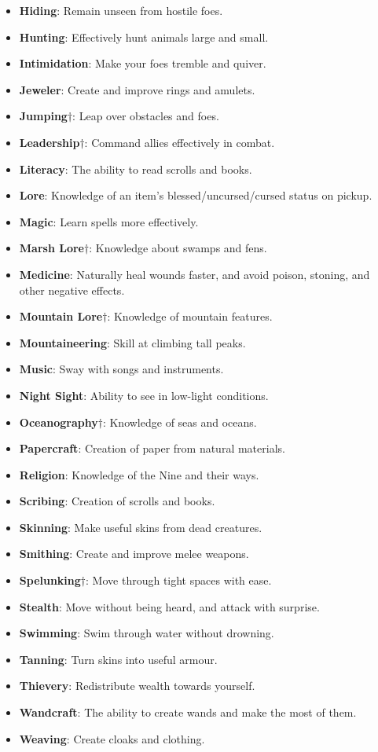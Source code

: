 \begin{itemize}
\item {\bf Hiding}: Remain unseen from hostile foes.
\item {\bf Hunting}: Effectively hunt animals large and small. 
\item {\bf Intimidation}: Make your foes tremble and quiver. 
\item {\bf Jeweler}: Create and improve rings and amulets. 
\item {\bf Jumping}$\dagger$: Leap over obstacles and foes.
\item {\bf Leadership}$\dagger$: Command allies effectively in combat. 
\item {\bf Literacy}: The ability to read scrolls and books.
\item {\bf Lore}: Knowledge of an item's blessed/uncursed/cursed status on pickup.
\item {\bf Magic}: Learn spells more effectively. 
\item {\bf Marsh Lore}$\dagger$: Knowledge about swamps and fens. 
\item {\bf Medicine}: Naturally heal wounds faster, and avoid poison, stoning, and other negative effects.
\item {\bf Mountain Lore}$\dagger$: Knowledge of mountain features. 
\item {\bf Mountaineering}: Skill at climbing tall peaks. 
\item {\bf Music}: Sway with songs and instruments. 
\item {\bf Night Sight}: Ability to see in low-light conditions. 
\item {\bf Oceanography}$\dagger$: Knowledge of seas and oceans. 
\item {\bf Papercraft}: Creation of paper from natural materials. 
\item {\bf Religion}: Knowledge of the Nine and their ways. 
\item {\bf Scribing}: Creation of scrolls and books. 
\item {\bf Skinning}: Make useful skins from dead creatures. 
\item {\bf Smithing}: Create and improve melee weapons.
\item {\bf Spelunking}$\dagger$: Move through tight spaces with ease.
\item {\bf Stealth}: Move without being heard, and attack with surprise.
\item {\bf Swimming}: Swim through water without drowning.
\item {\bf Tanning}: Turn skins into useful armour.
\item {\bf Thievery}: Redistribute wealth towards yourself.
\item {\bf Wandcraft}: The ability to create wands and make the most of them.
\item {\bf Weaving}: Create cloaks and clothing.
\end{itemize}

